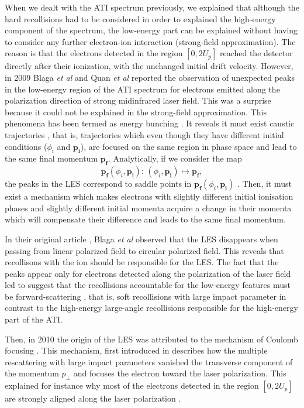 \documentclass[a4paper]{article}
\begin{document}
When we dealt with the ATI spectrum previously, we explained that although the hard recollisions had to be considered in order to explained the high-energy component of the spectrum, the low-energy part can be explained without having to consider any further electron-ion interaction (strong-field approximation). The reason is that the electrons detected in the region $[0,2U_{p}]$ reached the detector directly after their ionization, with the unchanged initial drift velocity.
However, in 2009 Blaga \textit{et al} \cite{Blaga_2009} and Quan \textit{et al} \cite{Quan_2009} reported the observation of unexpected peaks in the low-energy region of the ATI spectrum for electrons emitted along the polarization direction of strong midinfrared laser field. This was a surprise because it could not be explained in the strong-field approximation. This phenomena has been termed as energy bunching \cite{Kastner_2012_soft}. It reveals it must exist caustic trajectories \cite{Yan_2010}, that is, trajectories which even though they have different initial conditions ($\phi_{i}$ and $\mathbf{p_{i}}$), are focused on the same region in phase space and lead to the same final momentum $\mathbf{p_{f}}$. Analytically, if we consider the map 
\begin{equation}
\mathbf{p_{f}}(\phi_{i},\mathbf{p_{i}}): \, (\phi_{i},\mathbf{p_{i}}) \mapsto \mathbf{p_{f}},
\end{equation}
the peaks in the LES correspond to saddle points in $\mathbf{p_{f}}(\phi_{i},\mathbf{p_{i}})$ \cite{Kastner_2012_soft}.
Then, it must exist a mechanism which makes electrons with slightly different initial ionisation phases and slightly different initial momenta acquire a change in their momenta which will compensate their difference and leads to the same final momentum.
\par
In their original article \cite{Blaga_2009}, Blaga \textit{et al} observed that the LES disappears when passing from linear polarized field to circular polarized field. This reveals that recollisons with the ion should be responsible for the LES.
The fact that the peaks appear only for electrons detected along the polarization of the laser field led to suggest that the recollisions accountable for the low-energy features must be forward-scattering \cite{Faisal_2009}, that is, soft recollisions with large impact parameter in contrast to the high-energy large-angle recollisions responsible for the high-energy part of the ATI. 
\par 
Then, in 2010 the origin of the LES was attributed to the mechanism of Coulomb focusing \cite{Liu_2010}. This mechanism, first introduced in \cite{Misha_1996} describes how the multiple rescattering with large impact parameters vanished the transverse component of the momentum $p_{\perp}$ and focuses the electron toward the laser polarization. This explained for instance why most of the electrons detected in the region $[0,2U_{p}]$ are strongly aligned along the laser polarization \cite{Walker_1996}.
\end{document}
